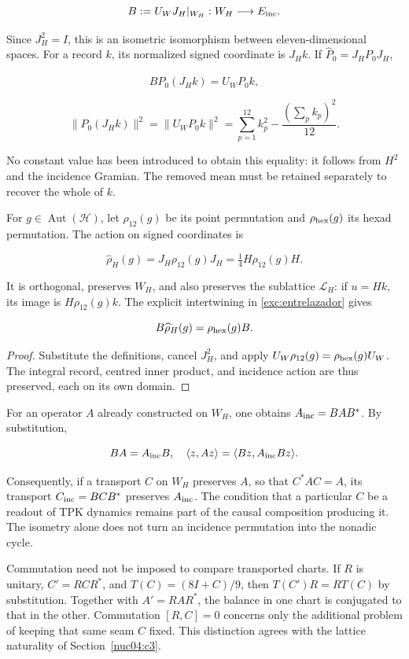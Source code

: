 \[
B:=U_WJ_H|_{W_H}:W_H\longrightarrow E_{\rm inc}.
\]

Since \(J_H^2=I\), this is an isometric isomorphism between eleven-dimensional spaces. For a record \(k\), its normalized signed coordinate is \(J_Hk\). If \(\widehat P_0=J_HP_0J_H\),

\[
B\widehat P_0(J_Hk)=U_WP_0k,
\]

\[
\|\widehat P_0(J_Hk)\|^2
=\|U_WP_0k\|^2
=\sum_{p=1}^{12}k_p^2-\frac{(\sum_pk_p)^2}{12}.
\]

No constant value has been introduced to obtain this equality: it follows from \(H^2\) and the incidence Gramian. The removed mean must be retained separately to recover the whole of \(k\).

For \(g\in\operatorname{Aut}(\mathcal H)\), let \(\rho_{12}(g)\) be its point permutation and \(\rho_{\rm hex}(g)\) its hexad permutation. The action on signed coordinates is

\[
\widehat\rho_H(g)=J_H\rho_{12}(g)J_H
=\tfrac14H\rho_{12}(g)H.
\]

It is orthogonal, preserves \(W_H\), and also preserves the sublattice \(\mathcal L_H\): if \(u=Hk\), its image is \(H\rho_{12}(g)k\). The explicit intertwining in \cref{exc:entrelazador} gives

\[
B\widehat\rho_H(g)=\rho_{\rm hex}(g)B.
\]

\begin{proof}
Substitute the definitions, cancel \(J_H^2\), and apply \(U_W\rho_{12}(g)=\rho_{\rm hex}(g)U_W\). The integral record, centred inner product, and incidence action are thus preserved, each on its own domain.
\end{proof}

For an operator \(A\) already constructed on \(W_H\), one obtains \(A_{\rm inc}=BAB^*\). By substitution,

\[
BA=A_{\rm inc}B,\quad
\langle z,Az\rangle=\langle Bz,A_{\rm inc}Bz\rangle.
\]

Consequently, if a transport \(C\) on \(W_H\) preserves \(A\), so that \(C^*AC=A\), its transport \(C_{\rm inc}=BCB^*\) preserves \(A_{\rm inc}\). The condition that a particular \(C\) be a readout of TPK dynamics remains part of the causal composition producing it. The isometry alone does not turn an incidence permutation into the nonadic cycle.

Commutation need not be imposed to compare transported charts. If \(R\) is unitary, \(C'=RCR^*\), and \(T(C)=(8I+C)/9\), then \(T(C')R=RT(C)\) by substitution. Together with \(A'=RAR^*\), the balance in one chart is conjugated to that in the other. Commutation \([R,C]=0\) concerns only the additional problem of keeping that same seam \(C\) fixed. This distinction agrees with the lattice naturality of Section~\ref{nuc04:c3}.

